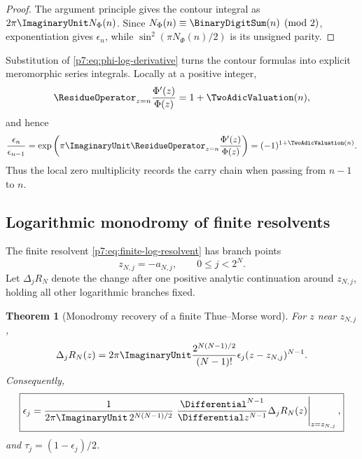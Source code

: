 \documentclass[11pt]{article}
\newtheorem{theorem}{Theorem}[section]
\theoremstyle{definition}
\theoremstyle{remark}
\begin{document}
\begin{proof}
The argument principle gives the contour integral as \(2\pi\ImaginaryUnit N_\Phi(n)\). Since
\(N_\Phi(n)\equiv \BinaryDigitSum(n)\pmod2\), exponentiation gives \(\epsilon_n\), while
\(\sin^2(\pi N_\Phi(n)/2)\) is its unsigned parity.
\end{proof}

Substitution of \eqref{p7:eq:phi-log-derivative} turns the contour formulas into explicit
meromorphic series integrals. Locally at a positive integer,
\begin{equation}
 \ResidueOperator_{z=n}\frac{\Phi'(z)}{\Phi(z)}=1+\TwoAdicValuation(n),
 \label{p7:eq:local-residue}
\end{equation}
and hence
\begin{equation}
 \frac{\epsilon_n}{\epsilon_{n-1}}
 =\exp\left(\pi\ImaginaryUnit\ResidueOperator_{z=n}\frac{\Phi'(z)}{\Phi(z)}\right)
 =(-1)^{1+\TwoAdicValuation(n)}.
 \label{p7:eq:local-TM-ratio}
\end{equation}
Thus the local zero multiplicity records the carry chain when passing from \(n-1\) to \(n\).

\subsection{Logarithmic monodromy of finite resolvents}

The finite resolvent \eqref{p7:eq:finite-log-resolvent} has branch points
\begin{equation}
 z_{N,j}=-a_{N,j},\qquad 0\le j<2^N.
 \label{p7:eq:branch-points}
\end{equation}
Let \(\Delta_jR_N\) denote the change after one positive analytic continuation around
\(z_{N,j}\), holding all other logarithmic branches fixed.

\begin{theorem}[Monodromy recovery of a finite Thue--Morse word]
\label{p7:thm:monodromy-TM}
For \(z\) near \(z_{N,j}\),
\begin{equation}
 \Delta_jR_N(z)=2\pi\ImaginaryUnit\frac{2^{N(N-1)/2}}{(N-1)!}
 \epsilon_j(z-z_{N,j})^{N-1}.
 \label{p7:eq:monodromy-jump}
\end{equation}
Consequently,
\begin{equation}
 \boxed{\displaystyle
 \epsilon_j=\frac{1}{2\pi\ImaginaryUnit\,2^{N(N-1)/2}}
 \left.\frac{\Differential^{N-1}}{\Differential z^{N-1}}\Delta_jR_N(z)\right|_{z=z_{N,j}},}
 \label{p7:eq:epsilon-monodromy}
\end{equation}
and \(\tau_j=(1-\epsilon_j)/2\).
\end{theorem}
\end{document}
